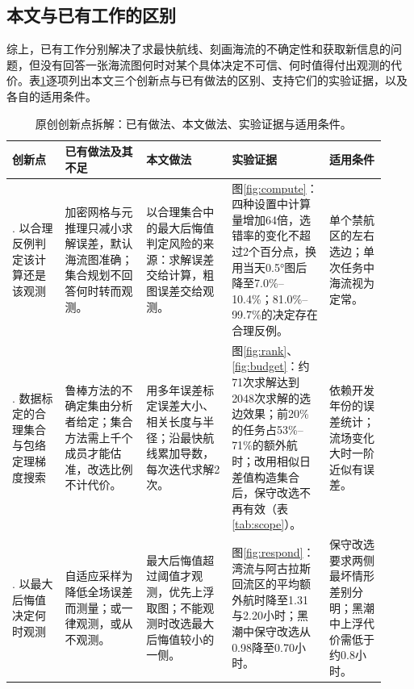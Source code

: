 \subsection{本文与已有工作的区别}
\label{sec:diff}
综上，已有工作分别解决了求最快航线、刻画海流的不确定性和获取新信息的问题，但没有回答一张海流图何时对某个具体决定不可信、何时值得付出观测的代价。表\ref{tab:innovation}逐项列出本文三个创新点与已有做法的区别、支持它们的实验证据，以及各自的适用条件。

\begin{table}[!htb]
\centering
\caption{原创创新点拆解：已有做法、本文做法、实验证据与适用条件。}
\label{tab:innovation}
\footnotesize
\setlength{\tabcolsep}{4pt}
\begin{tabular}{@{}>{\raggedright\arraybackslash}p{0.13\linewidth}>{\raggedright\arraybackslash}p{0.20\linewidth}>{\raggedright\arraybackslash}p{0.21\linewidth}>{\raggedright\arraybackslash}p{0.24\linewidth}>{\raggedright\arraybackslash}p{0.14\linewidth}@{}}
\toprule
创新点 & 已有做法及其不足 & 本文做法 & 实验证据 & 适用条件 \\
\midrule
1. 以合理反例判定该计算还是该观测 & 加密网格与元推理只减小求解误差，默认海流图准确；集合规划不回答何时转而观测。 & 以合理集合中的最大后悔值判定风险的来源：求解误差交给计算，粗图误差交给观测。 & 图\ref{fig:compute}：四种设置中计算量增加64倍，选错率的变化不超过2个百分点，换用当天0.5°图后降至7.0\%--10.4\%；81.0\%--99.7\%的决定存在合理反例。 & 单个禁航区的左右选边；单次任务中海流视为定常。 \\
\addlinespace
2. 数据标定的合理集合与包络定理梯度搜索 & 鲁棒方法的不确定集由分析者给定；集合方法需上千个成员才能估准，改选比例不计代价。 & 用多年误差标定误差大小、相关长度与半径；沿最快航线累加导数，每次迭代求解2次。 & 图\ref{fig:rank}、\ref{fig:budget}：约71次求解达到2048次求解的选边效果；前20\%的任务占53\%--71\%的额外航时；改用相似日差值构造集合后，保守改选不再有效（表\ref{tab:scope}）。 & 依赖开发年份的误差统计；流场变化大时一阶近似有误差。 \\
\addlinespace
3. 以最大后悔值决定何时观测 & 自适应采样为降低全场误差而测量；或一律观测，或从不观测。 & 最大后悔值超过阈值才观测，优先上浮取图；不能观测时改选最大后悔值较小的一侧。 & 图\ref{fig:respond}：湾流与阿古拉斯回流区的平均额外航时降至1.31与2.20小时；黑潮中保守改选从0.98降至0.70小时。 & 保守改选要求两侧最坏情形差别分明；黑潮中上浮代价需低于约0.8小时。 \\
\bottomrule
\end{tabular}
\end{table}
